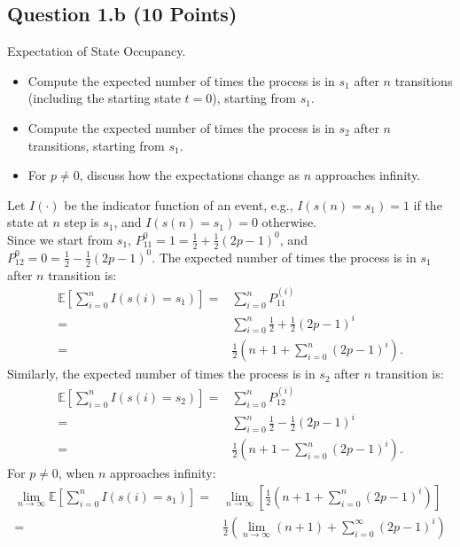 \documentclass[12pt]{article}
\begin{document}
\subsection*{Question 1.b (10 Points)} Expectation of State Occupancy.
    \begin{itemize}
        \item Compute the expected number of times the process is in $s_1$ after $n$ transitions (including the starting state $t=0$), starting from $s_1$. 
        \item Compute the expected number of times the process is in $s_2$ after $n$ transitions, starting from $s_1$.
        \item For $p \ne 0$, discuss how the expectations change as 
$n$ approaches infinity.
    \end{itemize}
\begin{solution}
Let $I(\cdot)$ be the indicator function of an event, e.g., $I(s(n)=s_1) = 1$ if the state at $n$ step is $s_1$, and $I(s(n)=s_1) = 0$ otherwise. \\
Since we start from $s_1$, $P^{0}_{11} = 1 = \frac{1}{2} + \frac{1}{2}(2p - 1)^{0}$, and $P^{0}_{12} = 0 = \frac{1}{2} - \frac{1}{2}(2p - 1)^{0}$.
The expected number of times the process is in $s_1$ after $n$ transition is:
\begin{align}
    \mathbb{E}[\sum_{i=0}^{n}I(s(i)=s_1)] 
    = & \sum_{i=0}^{n} P^{(i)}_{11} \\
    = & \sum_{i=0}^{n} \frac{1}{2} + \frac{1}{2}(2p - 1)^{i} \\
    = & \frac{1}{2}\left(n + 1 + \sum_{i=0}^{n}(2p - 1)^{i}\right).
\end{align}
Similarly, the expected number of times the process is in $s_2$ after $n$ transition is:
\begin{align}
    \mathbb{E}[\sum_{i=0}^{n}I(s(i)=s_2)] 
    = & \sum_{i=0}^{n} P^{(i)}_{12} \\
    = & \sum_{i=0}^{n} \frac{1}{2} - \frac{1}{2}(2p - 1)^{i} \\
    = & \frac{1}{2}\left(n + 1 - \sum_{i=0}^{n}(2p - 1)^{i}\right).
\end{align}
For $p\neq 0$, when $n$ approaches infinity:
\begin{align}
    \lim_{n\rightarrow \infty}\mathbb{E}[\sum_{i=0}^{n}I(s(i)=s_1)] 
    = & \lim_{n\rightarrow \infty} \left[ \frac{1}{2}\left(n + 1 + \sum_{i=0}^{n}(2p - 1)^{i}\right) \right] \\
    = & \frac{1}{2}\left(\lim_{n\rightarrow \infty}(n + 1) + \sum_{i=0}^{\infty}(2p - 1)^{i}\right) \\

\end{align}
\end{solution}
\end{document}
